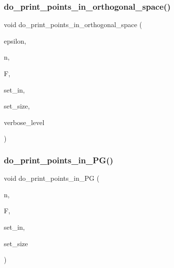 \mbox{\label{geometric__operations_8_c_ad99ca45c73f89c9931450224e5ee4c30}} 
\subsubsection{\texorpdfstring{do\+\_\+print\+\_\+points\+\_\+in\+\_\+orthogonal\+\_\+space()}{do\_print\_points\_in\_orthogonal\_space()}}
{\footnotesize\ttfamily void do\+\_\+print\+\_\+points\+\_\+in\+\_\+orthogonal\+\_\+space (\begin{DoxyParamCaption}\item[{\mbox{\hyperlink{galois_8h_a09fddde158a3a20bd2dcadb609de11dc}{I\+NT}}}]{epsilon,  }\item[{\mbox{\hyperlink{galois_8h_a09fddde158a3a20bd2dcadb609de11dc}{I\+NT}}}]{n,  }\item[{\mbox{\hyperlink{classfinite__field}{finite\+\_\+field}} $\ast$}]{F,  }\item[{\mbox{\hyperlink{galois_8h_a09fddde158a3a20bd2dcadb609de11dc}{I\+NT}} $\ast$}]{set\+\_\+in,  }\item[{\mbox{\hyperlink{galois_8h_a09fddde158a3a20bd2dcadb609de11dc}{I\+NT}}}]{set\+\_\+size,  }\item[{\mbox{\hyperlink{galois_8h_a09fddde158a3a20bd2dcadb609de11dc}{I\+NT}}}]{verbose\+\_\+level }\end{DoxyParamCaption})}

\mbox{\label{geometric__operations_8_c_a1f9d5f6be1a33eea7339c4e8ada45fef}} 
\subsubsection{\texorpdfstring{do\+\_\+print\+\_\+points\+\_\+in\+\_\+\+P\+G()}{do\_print\_points\_in\_PG()}}
{\footnotesize\ttfamily void do\+\_\+print\+\_\+points\+\_\+in\+\_\+\+PG (\begin{DoxyParamCaption}\item[{\mbox{\hyperlink{galois_8h_a09fddde158a3a20bd2dcadb609de11dc}{I\+NT}}}]{n,  }\item[{\mbox{\hyperlink{classfinite__field}{finite\+\_\+field}} $\ast$}]{F,  }\item[{\mbox{\hyperlink{galois_8h_a09fddde158a3a20bd2dcadb609de11dc}{I\+NT}} $\ast$}]{set\+\_\+in,  }\item[{\mbox{\hyperlink{galois_8h_a09fddde158a3a20bd2dcadb609de11dc}{I\+NT}}}]{set\+\_\+size }\end{DoxyParamCaption})}

